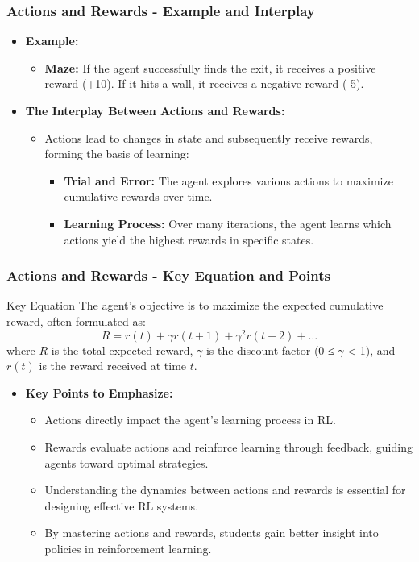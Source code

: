 \documentclass{beamer}
\begin{document}
\begin{frame}[fragile]
    \frametitle{Actions and Rewards - Example and Interplay}
    \begin{itemize}
        \item \textbf{Example:}
        \begin{itemize}
            \item \textbf{Maze:} If the agent successfully finds the exit, it receives a positive reward (+10). If it hits a wall, it receives a negative reward (-5).
        \end{itemize}
        \item \textbf{The Interplay Between Actions and Rewards:}
        \begin{itemize}
            \item Actions lead to changes in state and subsequently receive rewards, forming the basis of learning:
            \begin{itemize}
                \item \textbf{Trial and Error:} The agent explores various actions to maximize cumulative rewards over time.
                \item \textbf{Learning Process:} Over many iterations, the agent learns which actions yield the highest rewards in specific states.
            \end{itemize}
        \end{itemize}
    \end{itemize}
\end{frame}

\begin{frame}[fragile]
    \frametitle{Actions and Rewards - Key Equation and Points}
    \begin{block}{Key Equation}
        The agent's objective is to maximize the expected cumulative reward, often formulated as:
        \begin{equation}
            R = r(t) + \gamma r(t+1) + \gamma^2 r(t+2) + \ldots
        \end{equation}
        where \( R \) is the total expected reward, \( \gamma \) is the discount factor (0 ≤ \( \gamma \) < 1), and \( r(t) \) is the reward received at time \( t \).
    \end{block}
    \begin{itemize}
        \item \textbf{Key Points to Emphasize:}
        \begin{itemize}
            \item Actions directly impact the agent's learning process in RL.
            \item Rewards evaluate actions and reinforce learning through feedback, guiding agents toward optimal strategies.
            \item Understanding the dynamics between actions and rewards is essential for designing effective RL systems.
            \item By mastering actions and rewards, students gain better insight into policies in reinforcement learning.
        \end{itemize}
    \end{itemize}
\end{frame}
\end{document}
